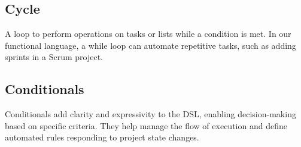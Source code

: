 \subsection{Cycle}
\label{sec:cycle}
A loop to perform operations on tasks or lists while a condition is met. In our functional language, a while loop can automate repetitive tasks, such as adding sprints in a Scrum project.

\subsection{Conditionals}
\label{sec:conditionals}
Conditionals add clarity and expressivity to the DSL, enabling decision-making based on specific criteria. They help manage the flow of execution and define automated rules responding to project state changes.

